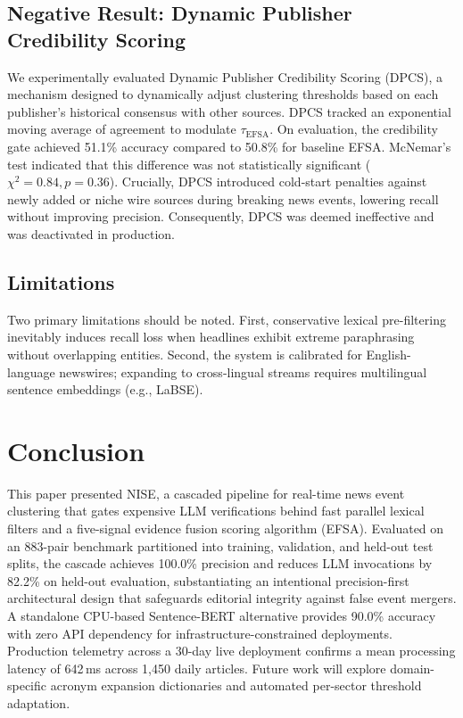 \documentclass[conference]{IEEEtran}
\begin{document}
\subsection{Negative Result: Dynamic Publisher Credibility Scoring}
We experimentally evaluated Dynamic Publisher Credibility Scoring (DPCS), a mechanism designed to dynamically adjust clustering thresholds based on each publisher's historical consensus with other sources.
DPCS tracked an exponential moving average of agreement to modulate $\tau_{\text{EFSA}}$.
On evaluation, the credibility gate achieved 51.1\% accuracy compared to 50.8\% for baseline EFSA.
McNemar's test indicated that this difference was not statistically significant ($\chi^2 = 0.84, p = 0.36$).
Crucially, DPCS introduced cold-start penalties against newly added or niche wire sources during breaking news events, lowering recall without improving precision.
Consequently, DPCS was deemed ineffective and was deactivated in production.

\subsection{Limitations}
Two primary limitations should be noted.
First, conservative lexical pre-filtering inevitably induces recall loss when headlines exhibit extreme paraphrasing without overlapping entities.
Second, the system is calibrated for English-language newswires; expanding to cross-lingual streams requires multilingual sentence embeddings (e.g., LaBSE).

\section{Conclusion}

This paper presented NISE, a cascaded pipeline for real-time news event clustering that gates expensive LLM verifications behind fast parallel lexical filters and a five-signal evidence fusion scoring algorithm (EFSA).
Evaluated on an 883-pair benchmark partitioned into training, validation, and held-out test splits, the cascade achieves 100.0\% precision and reduces LLM invocations by 82.2\% on held-out evaluation, substantiating an intentional precision-first architectural design that safeguards editorial integrity against false event mergers.
A standalone CPU-based Sentence-BERT alternative provides 90.0\% accuracy with zero API dependency for infrastructure-constrained deployments.
Production telemetry across a 30-day live deployment confirms a mean processing latency of 642\,ms across 1,450 daily articles.
Future work will explore domain-specific acronym expansion dictionaries and automated per-sector threshold adaptation.
\end{document}
